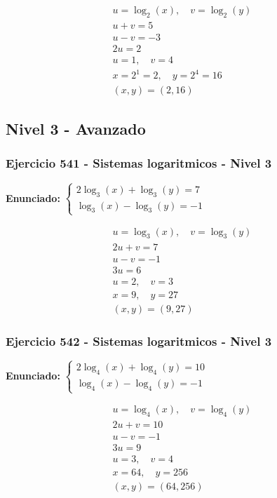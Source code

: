 \documentclass[12pt,a4paper]{article}
\begin{document}
\[
\begin{aligned}
u=\log_{2}\left(x\right),\quad v=\log_{2}\left(y\right)\\
u+v=5\\
u-v=-3\\
2u=2\\
u=1,\quad v=4\\
x=2^{1}=2,\quad y=2^{4}=16\\
\boxed{(x,y)=(2,16)}
\end{aligned}
\]


\newpage

\subsection*{Nivel 3 - Avanzado}

\subsubsection*{Ejercicio 541 - Sistemas logaritmicos - Nivel 3}
\textbf{Enunciado:} \(\begin{cases} 2\log_{3}\left(x\right)+\log_{3}\left(y\right)=7\\ \log_{3}\left(x\right)-\log_{3}\left(y\right)=-1\end{cases}\)

\[
\begin{aligned}
u=\log_{3}\left(x\right),\quad v=\log_{3}\left(y\right)\\
2u+v=7\\
u-v=-1\\
3u=6\\
u=2,\quad v=3\\
x=9,\quad y=27\\
\boxed{(x,y)=(9,27)}
\end{aligned}
\]


\subsubsection*{Ejercicio 542 - Sistemas logaritmicos - Nivel 3}
\textbf{Enunciado:} \(\begin{cases} 2\log_{4}\left(x\right)+\log_{4}\left(y\right)=10\\ \log_{4}\left(x\right)-\log_{4}\left(y\right)=-1\end{cases}\)

\[
\begin{aligned}
u=\log_{4}\left(x\right),\quad v=\log_{4}\left(y\right)\\
2u+v=10\\
u-v=-1\\
3u=9\\
u=3,\quad v=4\\
x=64,\quad y=256\\
\boxed{(x,y)=(64,256)}
\end{aligned}
\]
\end{document}
